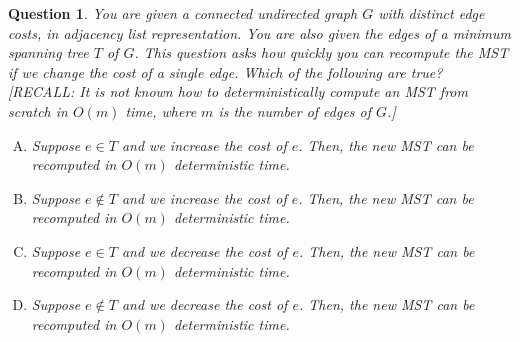 \documentclass{article}
\newtheorem{Q}{Question}
\begin{document}
\begin{Q}
	You are given a connected undirected graph $G$ with distinct edge costs, in adjacency list representation. You are also given the edges of a minimum spanning tree $T$ of $G$. This question asks how quickly you can recompute the MST if we change the cost of a single edge. Which of the following are true? [RECALL: It is not known how to deterministically compute an MST from scratch in $O(m)$ time, where $m$ is the number of edges of $G$.]
	
	\begin{enumerate}[(A)]
		\item Suppose $e\in T$ and we increase the cost of $e$. Then, the new MST can be recomputed in $O(m)$ deterministic time.
		\item Suppose $e\notin T$ and we increase the cost of $e$. Then, the new MST can be recomputed in $O(m)$ deterministic time.
		\item Suppose $e\in T$ and we decrease the cost of $e$. Then, the new MST can be recomputed in $O(m)$ deterministic time.
		\item Suppose $e\notin T$ and we decrease the cost of $e$. Then, the new MST can be recomputed in $O(m)$ deterministic time.
	\end{enumerate} 
\end{Q}


\pagebreak
\end{document}
